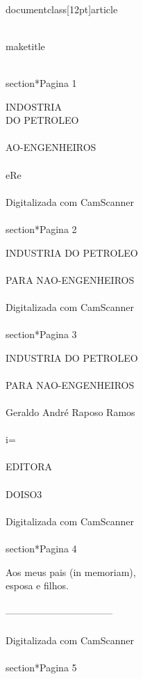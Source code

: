 \\documentclass[12pt]{article}
\begin{document}
\\maketitle

\\section*{Pagina 1}

INDOSTRIA\\
DO PETROLEO\\
\\
AO-ENGENHEIROS\\
\\
eRe\\
\\
Digitalizada com CamScanner\\

\\section*{Pagina 2}

INDUSTRIA DO PETROLEO\\
\\
PARA NAO-ENGENHEIROS\\
\\
Digitalizada com CamScanner\\

\\section*{Pagina 3}

INDUSTRIA DO PETROLEO\\
\\
PARA NAO-ENGENHEIROS\\
\\
Geraldo André Raposo Ramos\\
\\
i=\\
\\
EDITORA\\
\\
DOISO3\\
\\
Digitalizada com CamScanner\\

\\section*{Pagina 4}

Aos meus pais (in memoriam),\\
esposa e filhos.\\
\\
———————————\\
\\
Digitalizada com CamScanner\\

\\section*{Pagina 5}
\end{document}
